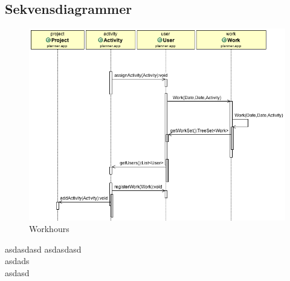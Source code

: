 \documentclass[a4paper,12pt]{article}
\begin{document}
\subsection{Sekvensdiagrammer}
\begin{figure}[htp]
\centering
\includegraphics[scale=0.5]{seq1.png}
\caption{Workhours}
\end{figure}
asdasdasd
asdasdasd\\asdads\\asdasd
\end{document}
